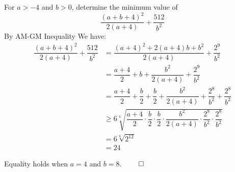 	For $a > -4$ and $b > 0$, determine the minimum value of $$\frac{(a+b+4)^2}{2(a+4)}+\frac{512}{b^2}$$
	\newpage
	By AM-GM Inequality We have:
	\begin{align*}
		\dfrac{(a+b+4)^2}{2(a+4)}+\dfrac{512}{b^2} 
		&= \dfrac{(a+4)^2+2(a+4)b+b^2}{2(a+4)}+\dfrac{2^{9}}{b^2}\\[5pt] &=\dfrac{a+4}{2}+b+\dfrac{b^2}{2(a+4)}+\dfrac{2^{9}}{b^2}\\[5pt] &=\dfrac{a+4}{2}+\dfrac{b}{2}+\dfrac{b}{2}+\dfrac{b^2}{2(a+4)}+\dfrac{2^{8}}{b^2}+\dfrac{2^{8}}{b^2}\\[5pt] &\ge 6\sqrt[6]{\dfrac{a+4}{2} \cdot \dfrac{b}{2} \cdot \dfrac{b}{2} \cdot \dfrac{b^2}{2(a+4)} \cdot \dfrac{2^{8}}{b^2} \cdot \dfrac{2^{8}}{b^2}}\\ &=6\sqrt[6]{2^{12}}\\ &= 24
	\end{align*}

Equality holds when $a=4$ and $b=8$. $\qed$

	
	
